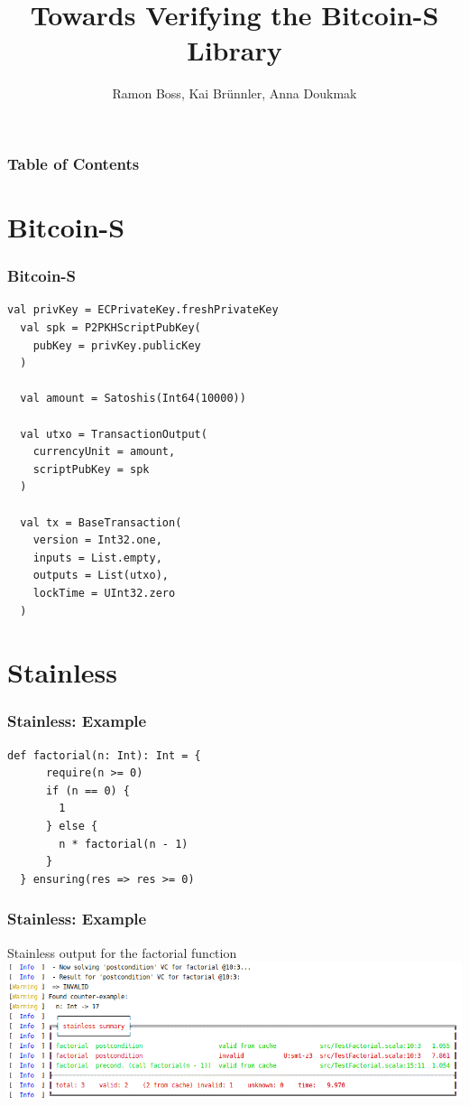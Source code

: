 \documentclass{beamer}
\begin{document}
\title{Towards Verifying the Bitcoin-S Library}

\author{Ramon Boss, Kai Brünnler, Anna Doukmak}

\frame{\titlepage}


\begin{frame}
  \frametitle{Table of Contents}
  \tableofcontents
\end{frame}


\section{Bitcoin-S}

\begin{frame}[fragile]
  \frametitle{Bitcoin-S}
\begin{lstlisting}[style=scala]
  val privKey = ECPrivateKey.freshPrivateKey
  val spk = P2PKHScriptPubKey(
    pubKey = privKey.publicKey
  )

  val amount = Satoshis(Int64(10000))

  val utxo = TransactionOutput(
    currencyUnit = amount, 
    scriptPubKey = spk
  )

  val tx = BaseTransaction(
    version = Int32.one,
    inputs = List.empty,
    outputs = List(utxo),
    lockTime = UInt32.zero
  )
\end{lstlisting}
\end{frame}




\section{Stainless}


\begin{frame}[fragile]
\frametitle{Stainless: Example}
\begin{lstlisting}[style=scala]
  def factorial(n: Int): Int = {
      require(n >= 0)
      if (n == 0) {
        1
      } else {
        n * factorial(n - 1)
      }
  } ensuring(res => res >= 0)
\end{lstlisting}
\end{frame}



\begin{frame}[fragile]
\frametitle{Stainless: Example}
\begin{block}{Stainless output for the factorial function}
  \medskip
	\centering
		\includegraphics[width=\textwidth]{output1.png}
  \end{block}
\end{frame}
\end{document}
